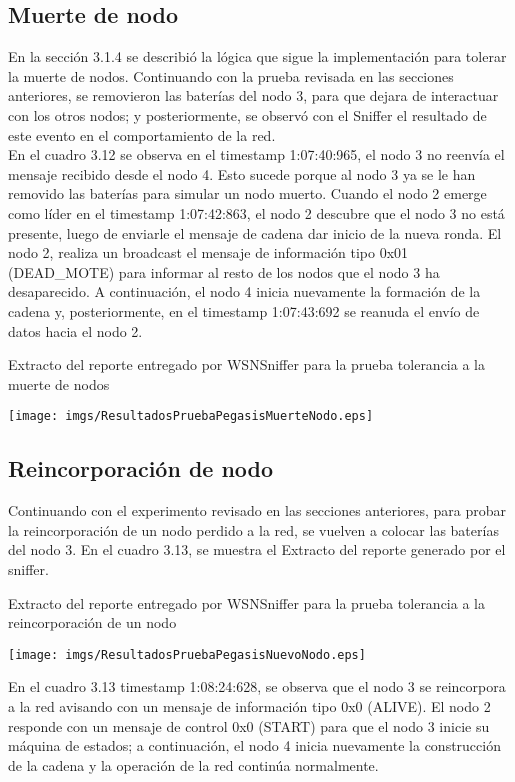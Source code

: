 \subsection{Muerte de nodo}
En la sección 3.1.4 se describió la lógica que sigue la implementación para tolerar la muerte de nodos. Continuando con la prueba revisada en las secciones anteriores, se removieron las baterías del nodo 3, para que dejara de interactuar con los otros nodos; y posteriormente, se observó con el Sniffer el resultado de este evento en el comportamiento de la red. \\

En el cuadro 3.12 se observa en el timestamp 1:07:40:965, el nodo 3 no reenvía el mensaje recibido desde el nodo 4. Esto sucede porque al nodo 3 ya se le han removido las baterías para simular un nodo muerto. Cuando el nodo 2 emerge como líder en el timestamp 1:07:42:863, el nodo 2 descubre que el nodo 3 no está presente, luego de enviarle el mensaje de cadena dar inicio de la nueva ronda. El nodo 2, realiza un broadcast el mensaje de información tipo 0x01 (DEAD\_MOTE) para informar al resto de los nodos que el nodo 3 ha desaparecido. A continuación, el nodo 4 inicia nuevamente la formación de la cadena y, posteriormente, en el timestamp 1:07:43:692 se reanuda el envío de datos hacia el nodo 2.

\begin{table}[H]
  \centering
  \caption{Extracto del reporte entregado por WSNSniffer para la prueba tolerancia a la muerte de nodos}
 \texttt{[image: imgs/ResultadosPruebaPegasisMuerteNodo.eps]}
 \end{table}

\subsection{Reincorporación de nodo}
Continuando con el experimento revisado en las secciones anteriores, para probar la reincorporación de un nodo perdido a la red, se vuelven a colocar las baterías del nodo 3. En el cuadro 3.13, se muestra el Extracto del reporte generado por el sniffer.

\begin{table}[H]
  \centering
  \caption{Extracto del reporte entregado por WSNSniffer para la prueba tolerancia a la reincorporación de un nodo}
 \texttt{[image: imgs/ResultadosPruebaPegasisNuevoNodo.eps]}
 \end{table}
 
En el cuadro 3.13 timestamp 1:08:24:628, se observa que el nodo 3 se reincorpora a la red avisando con un mensaje de información tipo 0x0 (ALIVE). El nodo 2 responde con un mensaje de control 0x0 (START) para que el nodo 3 inicie su máquina de estados; a continuación, el nodo 4 inicia nuevamente la construcción de la cadena y la operación de la red continúa normalmente.
